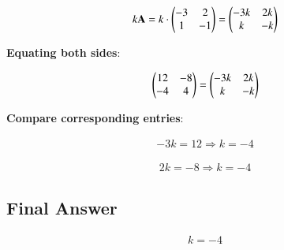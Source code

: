\documentclass{article}
\begin{document}
\begin{align}
k\textbf{A} = k \cdot \begin{pmatrix}-3 & 2 \\ 1 & -1\end{pmatrix} = \begin{pmatrix}-3k & 2k \\ k & -k\end{pmatrix}
\end{align}

\textbf{Equating both sides}:

\begin{align}
\begin{pmatrix}12 & -8 \\ -4 & 4\end{pmatrix} = \begin{pmatrix}-3k & 2k \\ k & -k\end{pmatrix}
\end{align}

\textbf{Compare corresponding entries}:

\begin{align}
-3k = 12 \Rightarrow k = -4
\end{align}

\begin{align}
2k = -8 \Rightarrow k = -4
\end{align}


\subsection*{Final Answer}
\begin{align}
\boxed{k = -4}
\end{align}
\end{document}
